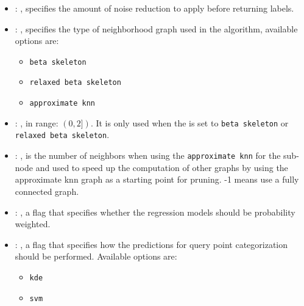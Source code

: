 \begin{itemize}
    \item {}: , 
      specifies the                                                  amount of noise reduction to
      apply before returning labels.

    \item {}: , 
      specifies the type                                                  of neighborhood graph used
      in the algorithm, available options are:
      \begin{itemize}                                                    \item \texttt{beta
      skeleton}                                                    \item \texttt{relaxed beta
      skeleton}                                                    \item \texttt{approximate knn}
      \end{itemize}

    \item {}: , 
      in range: $(0, 2])$. It is                                                  only used when the
       is set to \texttt{beta skeleton} or
      \texttt{relaxed beta skeleton}.

    \item {}: , 
      is the number of                                                  neighbors when using the
      \texttt{approximate knn} for the 
      sub-node and used to speed up the computation of other graphs by using the
      approximate knn graph as a starting point for pruning. -1 means use a fully
      connected graph.

    \item {}: , 
      a flag that specifies                                                  whether the regression
      models should be probability weighted.

    \item {}: , 
      a flag that                                                  specifies how the predictions for
      query point categorization  should be
      performed. Available options are:
      \begin{itemize}                                                    \item \texttt{kde}
      \item \texttt{svm}                                                  \end{itemize}


\end{itemize}
